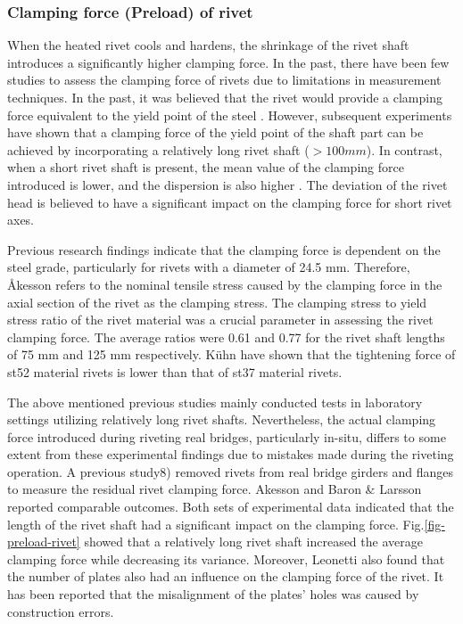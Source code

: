 \subsubsection{Clamping force (Preload) of rivet}

When the heated rivet cools and hardens, the shrinkage of the rivet shaft introduces a significantly higher clamping force. In the past, there have been few studies to assess the clamping force of rivets due to limitations in measurement techniques. In the past, it was believed that the rivet would provide a clamping force equivalent to the yield point of the steel \cite{VanMaarschalkerwaart1982FatigueJoints}. However, subsequent experiments have shown that a clamping force of the yield point of the shaft part can be achieved by incorporating a relatively long rivet shaft ($>100 mm$). In contrast, when a short rivet shaft is present, the mean value of the clamping force introduced is lower, and the dispersion is also higher \cite{Zhou1994FatigueMembers, Baron1953TheJoints}. The deviation of the rivet head is believed to have a significant impact on the clamping force for short rivet axes.

Previous research findings \cite{Zhou1994FatigueMembers} indicate that the clamping force is dependent on the steel grade, particularly for rivets with a diameter of 24.5 mm. Therefore, Åkesson \cite{Akesson2010} refers to the nominal tensile stress caused by the clamping force in the axial section of the rivet as the clamping stress. The clamping stress to yield stress ratio of the rivet material was a crucial parameter in assessing the rivet clamping force. The average ratios were 0.61 and 0.77 for the rivet shaft lengths of 75 mm and 125 mm respectively. K{\"u}hn \cite{Kuhn2008AssessmentLife} have shown that the tightening force of st52 material rivets is lower than that of st37 material rivets.

The above mentioned previous studies mainly conducted tests in laboratory settings utilizing relatively long rivet shafts. Nevertheless, the actual clamping force introduced during riveting real bridges, particularly in-situ, differs to some extent from these experimental findings due to mistakes made during the riveting operation. A previous study8) removed rivets from real bridge girders and flanges to measure the residual rivet clamping force. Akesson \cite{Akesson2010} and Baron \& Larsson \cite{Baron1953TheJoints} reported comparable outcomes. Both sets of experimental data indicated that the length of the rivet shaft had a significant impact on the clamping force. Fig.\ref{fig-preload-rivet} showed that a relatively long rivet shaft increased the average clamping force while decreasing its variance. Moreover, Leonetti \cite{Leonetti2020RivetBridges} also found that the number of plates also had an influence on the clamping force of the rivet. It has been reported that the misalignment of the plates' holes was caused by construction errors.

